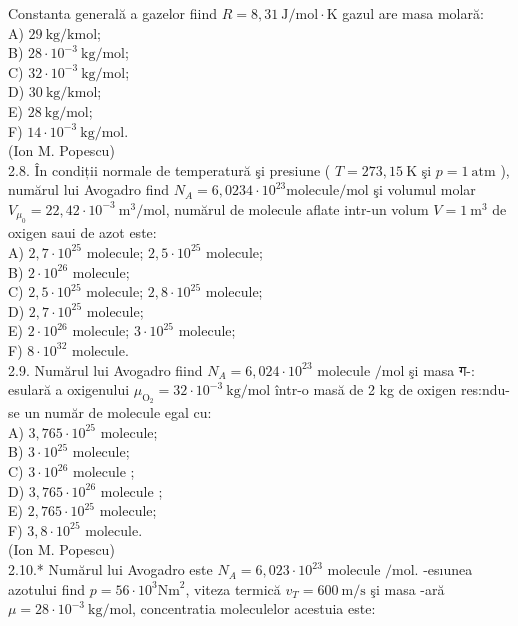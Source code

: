 Constanta generală a gazelor fiind $R=8,31 \mathrm{~J} / \mathrm{mol} \cdot \mathrm{K}$ gazul are masa molară:\\
A) $29 \mathrm{~kg} / \mathrm{kmol}$;\\
B) $28 \cdot 10^{-3} \mathrm{~kg} / \mathrm{mol}$;\\
C) $32 \cdot 10^{-3} \mathrm{~kg} / \mathrm{mol}$;\\
D) $30 \mathrm{~kg} / \mathrm{kmol}$;\\
E) $28 \mathrm{~kg} / \mathrm{mol}$;\\
F) $14 \cdot 10^{-3} \mathrm{~kg} / \mathrm{mol}$.\\
(Ion M. Popescu)\\
2.8. În condiții normale de temperatură şi presiune ( $T=273,15 \mathrm{~K}$ şi $p=1 \mathrm{~atm}$ ), numărul lui Avogadro find $N_{A}=6,0234 \cdot 10^{23} \mathrm{molecule} / \mathrm{mol}$ şi volumul molar $V_{\mu_{0}}=22,42 \cdot 10^{-3} \mathrm{~m}^{3} / \mathrm{mol}$, numărul de molecule aflate intr-un volum $V=1 \mathrm{~m}^{3}$ de oxigen saui de azot este:\\
A) $2,7 \cdot 10^{25}$ molecule; $2,5 \cdot 10^{25}$ molecule;\\
B) $2 \cdot 10^{26}$ molecule;\\
C) $2,5 \cdot 10^{25}$ molecule; $2,8 \cdot 10^{25}$ molecule;\\
D) $2,7 \cdot 10^{25}$ molecule;\\
E) $2 \cdot 10^{26}$ molecule; $3 \cdot 10^{25}$ molecule;\\
F) $8 \cdot 10^{32}$ molecule.\\
2.9. Numărul lui Avogadro fiind $N_{A}=6,024 \cdot 10^{23}$ molecule $/ \mathrm{mol}$ şi masa ग-: esulară a oxigenului $\mu_{\mathrm{O}_{2}}=32 \cdot 10^{-3} \mathrm{~kg} / \mathrm{mol}$ într-o masă de 2 kg de oxigen res:ndu-se un număr de molecule egal cu:\\
A) $3,765 \cdot 10^{25}$ molecule;\\
B) $3 \cdot 10^{25}$ molecule;\\
C) $3 \cdot 10^{26}$ molecule ;\\
D) $3,765 \cdot 10^{26}$ molecule ;\\
E) $2,765 \cdot 10^{25}$ molecule;\\
F) $3,8 \cdot 10^{25}$ molecule.\\
(Ion M. Popescu)\\
2.10.* Numărul lui Avogadro este $N_{A}=6,023 \cdot 10^{23}$ molecule $/ \mathrm{mol}$. -esıunea azotului find $p=56 \cdot 10^{3} \mathrm{Nm}^{2}$, viteza termică $v_{T}=600 \mathrm{~m} / \mathrm{s}$ şi masa -ară $\mu=28 \cdot 10^{-3} \mathrm{~kg} / \mathrm{mol}$, concentratia moleculelor acestuia este:\\
